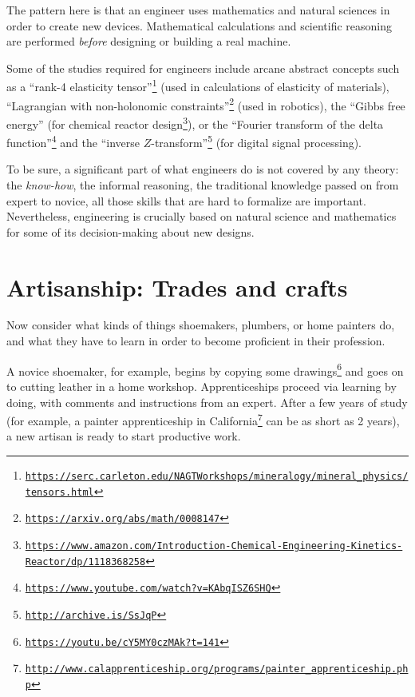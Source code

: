 The pattern here is that an engineer uses mathematics and natural
sciences in order to create new devices. Mathematical calculations
and scientific reasoning are performed \emph{before} designing or
building a real machine.

Some of the studies required for engineers include arcane abstract
concepts such as a \textsf{``}rank-4 elasticity tensor\textsf{''}\footnote{\texttt{\href{https://serc.carleton.edu/NAGTWorkshops/mineralogy/mineral_physics/tensors.html}{https://serc.carleton.edu/NAGTWorkshops/mineralogy/mineral\_physics/tensors.html}}}
(used in calculations of elasticity of materials), \textsf{``}Lagrangian with
non-holonomic constraints\textsf{''}\footnote{\texttt{\href{https://arxiv.org/abs/math/0008147}{https://arxiv.org/abs/math/0008147}}}
(used in robotics), the \textsf{``}Gibbs free energy\textsf{''} (for chemical reactor
design\footnote{\texttt{\href{https://www.amazon.com/Introduction-Chemical-Engineering-Kinetics-Reactor/dp/1118368258}{https://www.amazon.com/Introduction-Chemical-Engineering-Kinetics-Reactor/dp/1118368258}}}),
or the \textsf{``}Fourier transform of the delta function\textsf{''}\footnote{\texttt{\href{https://www.youtube.com/watch?v=KAbqISZ6SHQ}{https://www.youtube.com/watch?v=KAbqISZ6SHQ}}}
and the \textsf{``}inverse $Z$-transform\textsf{''}\footnote{\texttt{\href{http://archive.is/SsJqP}{http://archive.is/SsJqP}}}
(for digital signal processing).

To be sure, a significant part of what engineers do is not covered
by any theory: the \emph{know-how}, the informal reasoning, the traditional
knowledge passed on from expert to novice,  \textemdash{} all those
skills that are hard to formalize are important. Nevertheless, engineering
is crucially based on natural science and mathematics for some of
its decision-making about new designs.

\section{Artisanship: Trades and crafts }

Now consider what kinds of things shoemakers, plumbers, or home painters
do, and what they have to learn in order to become proficient in their
profession.

A novice shoemaker, for example, begins by copying some drawings\footnote{\texttt{\href{https://youtu.be/cY5MY0czMAk?t=141}{https://youtu.be/cY5MY0czMAk?t=141}}}
and goes on to cutting leather in a home workshop. Apprenticeships
proceed via learning by doing, with comments and instructions from
an expert. After a few years of study (for example, a painter apprenticeship
in California\footnote{\texttt{\href{http://www.calapprenticeship.org/programs/painter_apprenticeship.php}{http://www.calapprenticeship.org/programs/painter\_apprenticeship.php}}}
can be as short as 2 years), a new artisan is ready to start productive
work. 


